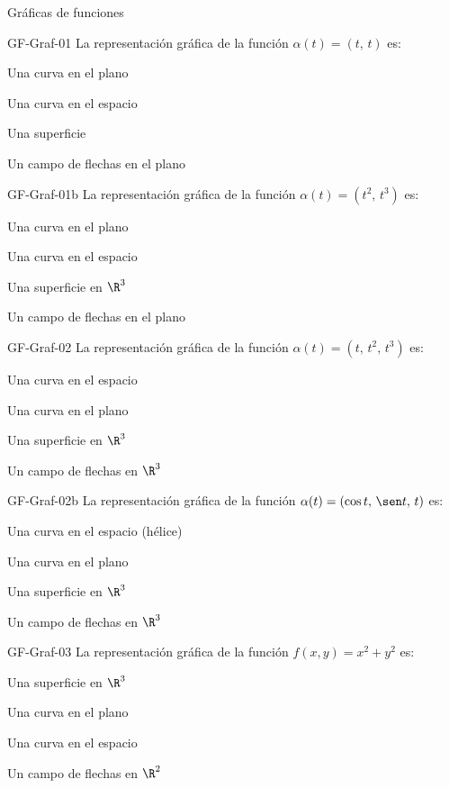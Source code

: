 \documentclass[a4,11pt]{aleph-notas}
\begin{document}
\begin{quiz}{Gráficas de funciones}

\begin{multi}[]%
    {GF-Graf-01}
    La representación gráfica de la función $\alpha(t)=(t,\, t)$ es:
    \item* Una curva en el plano
    \item Una curva en el espacio
    \item Una superficie
    \item Un campo de flechas en el plano
\end{multi}

\begin{multi}[]%
    {GF-Graf-01b}
    La representación gráfica de la función $\alpha(t)=(t^2,\, t^3)$ es:
    \item* Una curva en el plano
    \item Una curva en el espacio
    \item Una superficie en $\R^3$
    \item Un campo de flechas en el plano
\end{multi}

\begin{multi}[]%
    {GF-Graf-02}
    La representación gráfica de la función $\alpha(t)=(t,\, t^2,\, t^3)$ es:
    \item* Una curva en el espacio
    \item Una curva en el plano
    \item Una superficie en $\R^3$
    \item Un campo de flechas en $\R^3$
\end{multi}

\begin{multi}[]%
    {GF-Graf-02b}
    La representación gráfica de la función $\alpha(t)=(\cos t,\, \sen t,\, t)$ es:
    \item* Una curva en el espacio (hélice)
    \item Una curva en el plano
    \item Una superficie en $\R^3$
    \item Un campo de flechas en $\R^3$
\end{multi}

\begin{multi}[]%
    {GF-Graf-03}
    La representación gráfica de la función $f(x,y)=x^2+y^2$ es:
    \item* Una superficie en $\R^3$
    \item Una curva en el plano
    \item Una curva en el espacio
    \item Un campo de flechas en $\R^2$
\end{multi}


\end{quiz}
\end{document}

